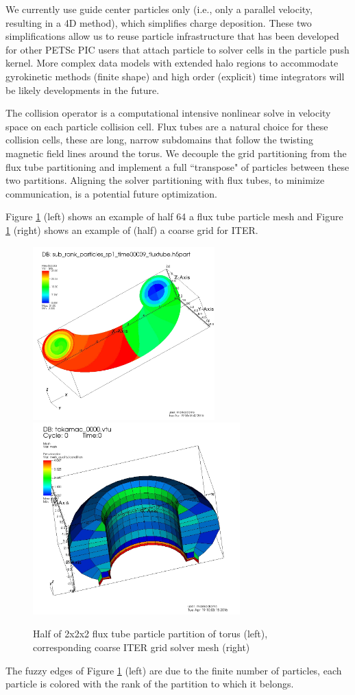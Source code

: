 \documentclass[review]{siamart}
\begin{document}
We currently use guide center particles only (i.e., only a parallel velocity, resulting in a 4D method), which simplifies charge deposition.
These two simplifications allow us to reuse particle infrastructure that has been developed for other PETSc PIC users \cite{may2014ptatin} that attach particle to solver cells in the particle push kernel.
More complex data models with extended halo regions to accommodate gyrokinetic methods (finite shape) and high order (explicit) time integrators will be likely developments in the future.

The collision operator is a computational intensive nonlinear solve in velocity space on each particle collision cell.
Flux tubes are a natural choice for these collision cells, these are long, narrow subdomains that follow the twisting magnetic field lines around the torus.
We decouple the grid partitioning from the flux tube partitioning and implement a full ``transpose" of particles between these two partitions.
Aligning the solver partitioning with flux tubes, to minimize communication, is a potential future optimization.

Figure \ref{fig:cross} (left) shows an example of half 64 a flux tube particle mesh and Figure \ref{fig:cross} (right) shows an example of (half) a coarse grid for ITER.
\begin{figure}[h!]
   \centering
   \includegraphics[width=70mm]{half_fluxtubes_64.jpeg} 
    \includegraphics[width=80mm]{half_grid_mesh.jpeg} 
   \caption{Half of  2x2x2 flux tube particle partition of torus (left), corresponding coarse ITER grid solver mesh (right)}
   \label{fig:cross}
\end{figure}
The fuzzy edges of Figure \ref{fig:cross} (left) are due to the finite number of particles, each particle is colored with the rank of the partition to which it belongs.
\end{document}

